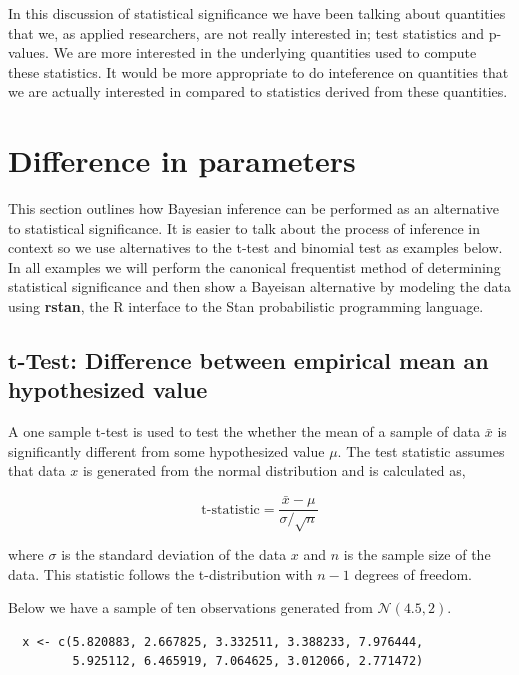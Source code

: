 \documentclass[12pt]{article}
\begin{document}
\noindent In this discussion of statistical significance we have been talking about quantities that we, as applied researchers, are not really interested in; test statistics and p-values. We are more interested in the underlying quantities used to compute these statistics. It would be more appropriate to do inteference on quantities that we are actually interested in compared to statistics derived from these quantities. \\

\section{Difference in parameters}

This section outlines how Bayesian inference can be performed as an alternative to statistical significance. It is easier to talk about the process of inference in context so we use alternatives to the t-test and binomial test as examples below. In all examples we will perform the canonical frequentist method of determining statistical significance and then show a Bayeisan alternative by modeling the data using \textbf{rstan}, the R interface to the Stan probabilistic programming language. \\

\subsection{t-Test: Difference between empirical mean an hypothesized value}

A one sample t-test is used to test the whether the mean of a sample of data $\bar{x}$ is significantly different from some hypothesized value $\mu$. The test statistic assumes that data $x$ is generated from the normal distribution and is calculated as,

$$
\mbox{t-statistic} = \frac{\bar{x}-\mu}{\sigma/\sqrt{n}}
$$

\noindent where $\sigma$ is the standard deviation of the data $x$ and $n$ is the sample size of the data. This statistic follows the t-distribution with $n-1$ degrees of freedom.

\noindent Below we have a sample of ten observations generated from $\mathcal{N}(4.5,2)$.

\begin{verbatim}
  x <- c(5.820883, 2.667825, 3.332511, 3.388233, 7.976444,
         5.925112, 6.465919, 7.064625, 3.012066, 2.771472)
\end{verbatim}
\end{document}
